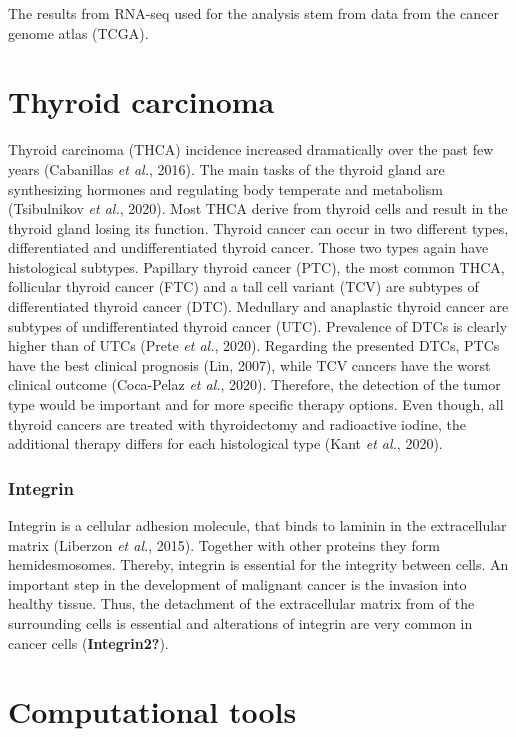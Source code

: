 \documentclass[
  parskip,
  oneside]{scrreprt}
\begin{document}
The results from RNA-seq used for the analysis stem from data from the
cancer genome atlas (TCGA).

\hypertarget{thyroid-carcinoma}{%
\section{Thyroid carcinoma}\label{thyroid-carcinoma}}

Thyroid carcinoma (THCA) incidence increased dramatically over the past
few years (Cabanillas \emph{et al.}, 2016). The main tasks of the
thyroid gland are synthesizing hormones and regulating body temperate
and metabolism (Tsibulnikov \emph{et al.}, 2020). Most THCA derive from
thyroid cells and result in the thyroid gland losing its function.
Thyroid cancer can occur in two different types, differentiated and
undifferentiated thyroid cancer. Those two types again have histological
subtypes. Papillary thyroid cancer (PTC), the most common THCA,
follicular thyroid cancer (FTC) and a tall cell variant (TCV) are
subtypes of differentiated thyroid cancer (DTC). Medullary and
anaplastic thyroid cancer are subtypes of undifferentiated thyroid
cancer (UTC). Prevalence of DTCs is clearly higher than of UTCs (Prete
\emph{et al.}, 2020). Regarding the presented DTCs, PTCs have the best
clinical prognosis (Lin, 2007), while TCV cancers have the worst
clinical outcome (Coca-Pelaz \emph{et al.}, 2020). Therefore, the
detection of the tumor type would be important and for more specific
therapy options. Even though, all thyroid cancers are treated with
thyroidectomy and radioactive iodine, the additional therapy differs for
each histological type (Kant \emph{et al.}, 2020).

\hypertarget{integrin}{%
\subsubsection{Integrin}\label{integrin}}

Integrin is a cellular adhesion molecule, that binds to laminin in the
extracellular matrix (Liberzon \emph{et al.}, 2015). Together with other
proteins they form hemidesmosomes. Thereby, integrin is essential for
the integrity between cells. An important step in the development of
malignant cancer is the invasion into healthy tissue. Thus, the
detachment of the extracellular matrix from of the surrounding cells is
essential and alterations of integrin are very common in cancer cells
(\textbf{Integrin2?}).

\hypertarget{computational-tools}{%
\section{Computational tools}\label{computational-tools}}
\end{document}
